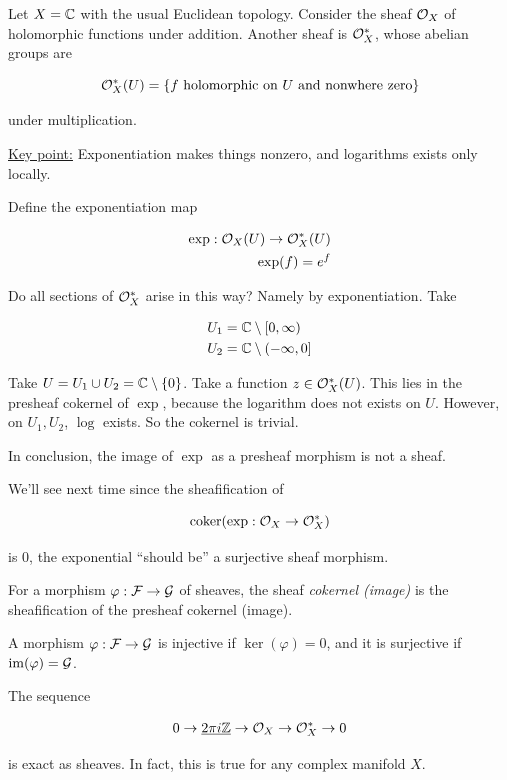 \documentclass{article}
\newcommand{\set}[1]{\left\{#1\right\}}
\begin{document}
\begin{example}
    Let \(X = \mathbb{C}\) with the usual Euclidean topology. Consider the sheaf \(\mathcal{O}_X\) of holomorphic functions under addition. Another sheaf is \(\mathcal{O}_X^*\), whose abelian groups are

    \[\mathcal{O}_X^*(U) = \left\{f \text{ holomorphic on }U \text{ and nonwhere zero}\right\}\]

    under multiplication. 
    
    \underline{Key point:} Exponentiation makes things nonzero, and logarithms exists only locally.

    Define the exponentiation map

    \begin{align*}
        \exp : \mathcal{O}_X(U) \to \mathcal{O}_X^*(U) \\
        \exp(f) = e^f
    \end{align*}

    Do all sections of \(\mathcal{O}_X^*\) arise in this way? Namely by exponentiation. Take

    \begin{align*}
        U_1 &= \mathbb{C} \setminus [0, \infty)\\
        U_2 &= \mathbb{C} \setminus (-\infty, 0]
    \end{align*}

    Take \(U = U_1 \cup U_2 = \C\setminus \set{0}\). Take a function \(z \in \mathcal{O}_X^*(U)\). This lies in the presheaf cokernel of \(\exp\), because the logarithm does not exists on \(U\). However, on \(U_1, U_2\), \(\log\) exists. So the cokernel is trivial.

    In conclusion, the image of \(\exp\) as a presheaf morphism is not a sheaf.
\end{example}

We'll see next time since the sheafification of

\[\operatorname{coker}(\exp : \mathcal{O}_X \to \mathcal{O}_X^*)\]

is \(0\), the exponential ``should be'' a surjective sheaf morphism.

\begin{definition}
    For a morphism \(\varphi : \mathcal{F} \to \mathcal{G}\) of sheaves, the sheaf \emph{cokernel (image)} is the sheafification of the presheaf cokernel (image).

    A morphism \(\varphi : \mathcal{F} \to \mathcal{G}\) is injective if \(\ker(\varphi) = 0\), and it is surjective if \(\operatorname{im}(\varphi) = \mathcal{G}\).
\end{definition}

\begin{remark}
    The sequence

    \[0 \to \underline{2\pi i \mathbb{Z}} \to \mathcal{O}_X \to \mathcal{O}_X^* \to 0\]

    is exact as sheaves. In fact, this is true for any complex manifold \(X\).
\end{remark}
\end{document}
